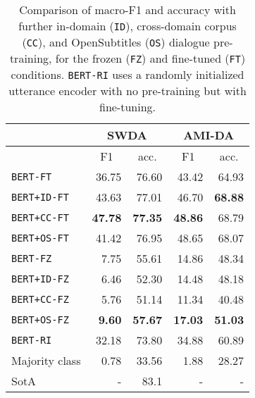 \documentclass[11pt,a4paper]{article}
\begin{document}
\begin{table}[]
\begin{tabular}{@{}lrrrr@{}}
\toprule
           & \multicolumn{2}{c}{SWDA}                          & \multicolumn{2}{c}{AMI-DA}                        \\ \midrule
           & \multicolumn{1}{c}{F1} & \multicolumn{1}{c}{acc.} & \multicolumn{1}{c}{F1} & \multicolumn{1}{c}{acc.} \\
\texttt{BERT-FT}    & 36.75                  & 76.60                    & 43.42                  & 64.93                    \\
\texttt{BERT+ID-FT} & 43.63                  & 77.01                    & 46.70                  & \textbf{68.88}           \\
\texttt{BERT+CC-FT} & \textbf{47.78}         & \textbf{77.35}           & \textbf{48.86}         & 68.79                    \\ 
\texttt{BERT+OS-FT} & 41.42                  & 76.95                    & 48.65                  & 68.07                    \\ \midrule
\texttt{BERT-FZ}    &  7.75                  & 55.61           & 14.86                  & 48.34                    \\
\texttt{BERT+ID-FZ} &  6.46                  & 52.30                    & 14.48                  & 48.18                    \\
\texttt{BERT+CC-FZ} &  5.76                  & 51.14                    & 11.34                  & 40.48                    \\ 
\texttt{BERT+OS-FZ} &  \textbf{9.60}         & \textbf{57.67}           & \textbf{17.03}         & \textbf{51.03}           \\ \midrule
\texttt{BERT-RI} & 32.18           & 73.80                    & 34.88                  & 60.89                    \\ \midrule
    Majority class  & 0.78                   & 33.56                    &  1.88                  & 28.27      \\ 
    SotA            &    -                   & 83.1\footnotemark                     &     -                  &     -      \\ \bottomrule
\end{tabular}
\caption{Comparison of macro-F1 and accuracy with further in-domain (\texttt{ID}), cross-domain corpus (\texttt{CC}), and OpenSubtitles (\texttt{OS}) dialogue pre-training,
for the frozen (\texttt{FZ}) and fine-tuned (\texttt{FT}) conditions. \texttt{BERT-RI} uses a randomly initialized utterance encoder with no pre-training but with fine-tuning.}
  \label{tab:results}
\end{table}
\end{document}
